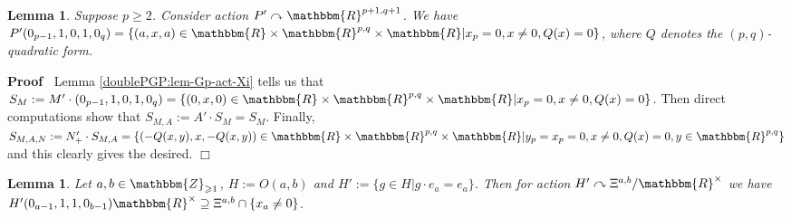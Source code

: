 \documentclass{article}
\newcommand{\assign}{:=}
\renewenvironment{proof}{\noindent\textbf{Proof\ }}{\hspace*{\fill}$\Box$\medskip}
\newtheorem{lemma}[proposition]{Lemma}
\theoremstyle{remark}
\begin{document}
\begin{lemma}
  \label{doublePGP:lem-ee}Suppose $p \geqslant 2$. Consider action $P'
  \curvearrowright \mathbbm{R}^{p + 1, q + 1}$. We have $P' (0_{p - 1}, 1, 0,
  1, 0_q) = \{ (a, x, a) \in \mathbbm{R} \times \mathbbm{R}^{p, q} \times
  \mathbbm{R} | x_p = 0, x \neq 0, Q (x) = 0 \}$, where $Q$ denotes the $(p,
  q)$-quadratic form.
\end{lemma}

\begin{proof}
  Lemma \ref{doublePGP:lem-Gp-act-Xi} tells us that $S_M \assign M' \cdot
  (0_{p - 1}, 1, 0, 1, 0_q) = \{ (0, x, 0) \in \mathbbm{R} \times
  \mathbbm{R}^{p, q} \times \mathbbm{R} | x_p = 0, x \neq 0, Q (x) = 0 \}$.
  Then direct computations show that $S_{M, A} \assign A' \cdot S_M = S_M$.
  Finally, $S_{M, A, N} \assign N_+' \cdot S_{M, A} = \{ (- Q (x, y), x, - Q
  (x, y)) \in \mathbbm{R} \times \mathbbm{R}^{p, q} \times \mathbbm{R} | y_p =
  x_p = 0, x \neq 0, Q (x) = 0, y \in \mathbbm{R}^{p, q} \}$ and this
  clearly gives the desired.
\end{proof}

\begin{lemma}
  \label{doublePGP:lem-en-aux}Let $a, b \in \mathbbm{Z}_{\geqslant 1}$, $H
  \assign O (a, b)$ and $H' \assign \{g \in H|g \cdot e_a = e_a \}$. Then for
  action $H' \curvearrowright \Xi^{a, b} /\mathbbm{R}^{\times}$ we have $H'
  (0_{a - 1}, 1, 1, 0_{b - 1}) \mathbbm{R}^{\times} \supseteq \Xi^{a, b} \cap
  \{ x_a \neq 0 \}$.
\end{lemma}
\end{document}
